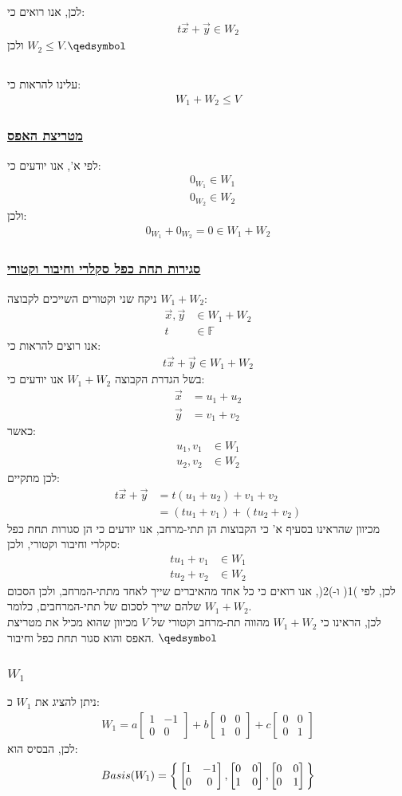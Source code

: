 \documentclass[a4paper, 12pt, leqno]{article}
\newcommand{\sub}[1]{\subsection{\underline{#1}}}
\newcommand{\subsub}[1]{\subsubsection{\underline{#1}}}
\newcommand{\F}{\ensuremath{\mathbb{F}}}
\newcommand{\eq}[1]{\begin{align*}#1\end{align*}}
\newcommand{\eqn}[1]{\begin{align}#1\end{align}}
\newcommand{\bigset}[1]{\bigg{\{} #1 \bigg{\}}}
\renewcommand{\qed}{\hfill\(\qedsymbol\)}
\renewcommand{\leq}{\leqslant}
\begin{document}
לכן, אנו רואים כי:
\eq{
    t\vec{x}+\vec{y}\in{W_2}
}
ולכן $W_2\leq{V}$.\qed
\sub{}
עלינו להראות כי:
\eq{
    W_1+W_2\leq{V}
}
\subsub{מטריצת האפס}
לפי א', אנו יודעים כי:
\eq{
    &0_{W_1}\in{W_1}\\
    &0_{W_2}\in{W_2}
}
ולכן:
\eq{
    0_{W_1}+0_{W_2}=0\in{W_1+W_2}
}
\subsub{סגירות תחת כפל סקלרי וחיבור וקטורי}
ניקח שני וקטורים השייכים לקבוצה $W_1+W_2$:
\eq{
    \vec{x},\vec{y}&\in{W_1+W_2}\\
    t&\in\F
}
אנו רוצים להראות כי:
\eq{
    t\vec{x}+\vec{y}\in{W_1+W_2}
}
בשל הגדרת הקבוצה $W_1+W_2$ אנו יודעים כי:
\eq{
    \vec{x}&=u_1+u_2\\
    \vec{y}&=v_1+v_2
}
כאשר:
\eq{
    u_1,v_1&\in{W_1}\\
    u_2,v_2&\in{W_2}
}
לכן מתקיים:
\eqn{
    t\vec{x}+\vec{y}&=t(u_1+u_2)+v_1+v_2\\
    &=(tu_1+v_1)+(tu_2+v_2)\nonumber
}
מכיוון שהראינו בסעיף א' כי הקבוצות הן תתי-מרחב, אנו יודעים כי הן סגורות תחת כפל סקלרי וחיבור וקטורי, ולכן:
\eqn{
    tu_1+v_1&\in{W_1}\\
    tu_2+v_2&\in{W_2}\nonumber
}
לכן, לפי )1( ו-)2(, אנו רואים כי כל אחד מהאיברים שייך לאחד מתתי-המרחב, ולכן הסכום שלהם שייך לסכום של תתי-המרחבים, כלומר $W_1+W_2$.\\
לכן, הראינו כי $W_1+W_2$ מהווה תת-מרחב וקטורי של $V$ מכיוון שהוא מכיל את מטריצת האפס והוא סגור תחת כפל וחיבור.
\qed
\sub{}
\subsub{$W_1$}
ניתן להציג את $W_1$ כ:
\eq{
    W_1=
    a\begin{bmatrix}
        1 & -1 \\ 0 & 0
    \end{bmatrix}
    +b\begin{bmatrix}
        0 & 0 \\ 1 & 0
    \end{bmatrix}
    +c\begin{bmatrix}
        0 & 0 \\ 0 & 1
    \end{bmatrix}
}
לכן, הבסיס הוא:
\eq{
    Basis(W_1)=\bigset{
    \begin{bmatrix}
        1 & -1 \\ 0 & 0
    \end{bmatrix}
    ,\begin{bmatrix}
        0 & 0 \\ 1 & 0
    \end{bmatrix}
    ,\begin{bmatrix}
        0 & 0 \\ 0 & 1
    \end{bmatrix}}
}
\end{document}
